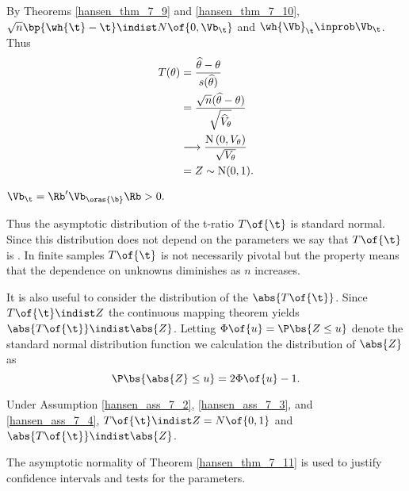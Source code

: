 By Theorems \ref{hansen_thm_7_9} and \ref{hansen_thm_7_10}, $\sqrt{n}\bp{\wh{\t}-\t} \indist N\of{0, \Vb_\t}$ and $\wh{\Vb}_\t \inprob \Vb_\t$. Thus 
\begin{equation}
    \notag
    \begin{aligned}
        T(\theta) & =\frac{\widehat{\theta}-\theta}{s(\widehat{\theta})} \\
        & =\frac{\sqrt{n}(\widehat{\theta}-\theta)}{\sqrt{\widehat{V}_\theta}} \\
        & \longrightarrow \frac{\mathrm{N}\left(0, V_\theta\right)}{\sqrt{V_\theta}} \\
        & =Z \sim \mathrm{N}(0,1) .
    \end{aligned}
\end{equation}

\begin{assumption}
    \label{hansen_ass_7_4}

    $\Vb_{\t} = \Rb^\prime \Vb_{\oras{\b}} \Rb > 0.$
\end{assumption}

Thus the asymptotic distribution of the t-ratio $T\of{\t}$ is standard normal. Since this distribution does not depend on the parameters we say that $T\of{\t}$ is . In finite samples $T\of{\t}$ is not necessarily pivotal but the property means that the dependence on unknowns diminishes as $n$ increases. 

It is also useful to consider the distribution of the  $\abs{T\of{\t}}$. Since $T\of{\t} \indist Z$ the continuous mapping theorem yields $\abs{T\of{\t}} \indist \abs{Z}$. Letting $\Phi\of{u} = \P\bs{Z \leq u}$ denote the standard normal distribution function we calculation the distribution of $\abs{Z}$ as 
\begin{equation}
    \label{hansen_eq_7_34}
    \P\bs{\abs{Z} \leq u} = 2 \Phi\of{u} - 1.
\end{equation}

\begin{theorem}
    \label{hansen_thm_7_11}

    Under Assumption \ref{hansen_ass_7_2}, \ref{hansen_ass_7_3}, and \ref{hansen_ass_7_4}, $T\of{\t} \indist Z = N\of{0,1}$ and $\abs{T\of{\t}} \indist \abs{Z}$.
\end{theorem}

The asymptotic normality of Theorem \ref{hansen_thm_7_11} is used to justify confidence intervals and tests for the parameters.

